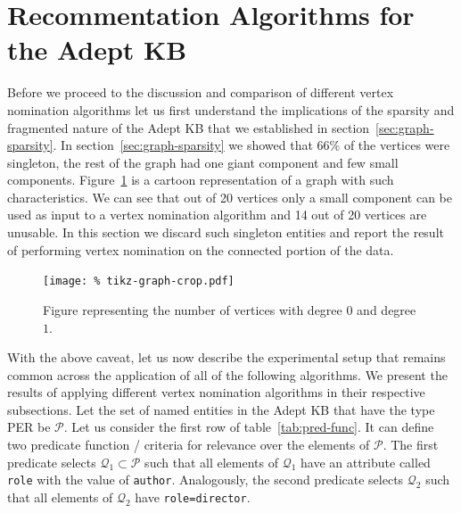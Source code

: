 \documentclass[paper=a4,fontsize=11pt]{scrartcl}
\newcommand{\secref}[1]{section~\ref{#1}}
\newcommand{\tabref}[1]{table~\ref{#1}}
\newcommand{\Figref}[1]{Figure~\ref{#1}}
\numberwithin{equation}{section}    %
\numberwithin{figure}{section}      %
\numberwithin{table}{section}       %
\begin{document}
\section{Recommentation Algorithms for the Adept KB}
\label{sec:er-algorithms}
Before we proceed to the discussion and comparison of different vertex
nomination algorithms let us first understand the implications of the sparsity
and fragmented nature of the Adept KB that we established in
\secref{sec:graph-sparsity}.  In \secref{sec:graph-sparsity} we showed that
$66\%$ of the vertices were singleton, the rest of the graph had one giant
component and few small components.  \Figref{fig:adept-cartoon} is a cartoon
representation of a graph with such characteristics.  We can see that out of 20
vertices only a small component can be used as input to a vertex nomination
algorithm and 14 out of 20 vertices are unusable. In this section we discard
such singleton entities and report the result of performing vertex nomination on
the connected portion of the data.
\begin{figure}[htbp]
  \centering
  \texttt{[image: \%
    tikz-graph-crop.pdf]}
  \caption{Figure representing the number of vertices with degree $0$ and degree
    $1$.}
  \label{fig:adept-cartoon}
\end{figure} With the above caveat, let us now describe the experimental setup
that remains common across the application of all of the following
algorithms. We present the results of applying different vertex nomination
algorithms in their respective subsections.  Let the set of named entities in
the Adept KB that have the type \textsc{PER} be $\mathcal{P}$.  Let us consider
the first row of \tabref{tab:pred-func}.  It can define two predicate function /
criteria for relevance over the elements of $\mathcal{P}$.  The first predicate
selects $\mathcal{Q_1} \subset \mathcal{P}$ such that all elements of
$\mathcal{Q_1}$ have an attribute called \texttt{role} with the value of
\texttt{author}.  Analogously, the second predicate selects $\mathcal{Q}_2$ such
that all elements of $\mathcal{Q}_2$ have \texttt{role=director}.
\end{document}
